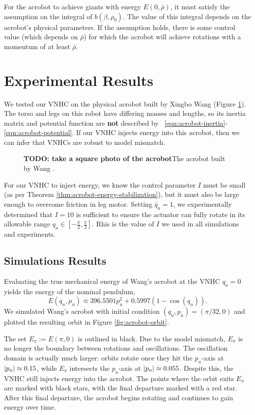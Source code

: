 \documentclass[journal,twoside,web]{ieeecolor}
\DeclarePairedDelimiter{\abs}{\lvert}{\rvert}
\begin{document}
For the acrobot to achieve giants with energy
\(E(0,\bar{\rho})\), it must satisfy the assumption on the integral
of \(b(\beta,\rho_0)\). 
The value of this integral depends on the acrobot's physical parameters.
If the assumption holds, there is some control value
(which depends on \(\bar{\rho}\)) for which the acrobot will 
achieve rotations with a momentum of at least \(\bar{\rho}\).

\section{Experimental Results}\label{sec:experiments}
We tested our VNHC on the physical acrobot built by
Xingbo Wang \cite{xingbo_thesis} (Figure \ref{fig:xingbo-acrobot}).
The torso and legs on this robot have differing masses and lengths, so
its inertia matrix and potential function are \textbf{not} described by 
~\eqref{eqn:acrobot-inertia}-\eqref{eqn:acrobot-potential}.
If our VNHC injects energy into this acrobot, then we can infer that
VNHCs are robust to model mismatch.

\begin{figure}
    \centering
    \caption{\textbf{TODO: take a square photo of the acrobot}The acrobot built by Wang \cite{xingbo_thesis}.}
    \label{fig:xingbo-acrobot}
\end{figure}

For our VNHC to inject energy, we know the control parameter \(I\) must be small
(as per Theorem \ref{thm:acrobot-energy-stabilization}), but it must also be
large enough to overcome friction in leg motor.
Setting \(\bar{q}_a = 1\), we experimentally determined that \(I = 10\) is
sufficient to ensure the actuator can fully rotate in its allowable range \(q_a
\in \left[ -\frac{\pi}{2}, \frac{\pi}{2}\right]\). 
Rhis is the value of \(I\) we used in all simulations and experiments.

\subsection{Simulations Results}
Evaluating the true mechanical energy of Wang's acrobot at the VNHC
\(q_a = 0\) yields the energy of the nominal pendulum,
\[
    E(q_u,p_u) \approx 396.5501 p_u^2 + 0.5997(1 - \cos(q_u))
    .
\]
We simulated Wang's acrobot with initial condition
\((q_u,p_u) = \left(\pi/32,0 \right)\) and plotted the resulting orbit
in Figure \ref{fig:acrobot-orbit}.

The set \(E_\pi := E(\pi,0)\) is outlined in black. 
Due to the model mismatch, \(E_\pi\) is no longer the boundary between
rotations and oscillations.
The oscillation domain is actually much larger: orbits rotate once they hit the
\(p_u\)-axis at \(\abs{p_u} \approx 0.15\), while \(E_\pi\) intersects the
\(p_u\)-axis at \(\abs{p_u} \approx 0.055\).
Despite this, the VNHC still injects energy into the acrobot.
The points where the orbit exits \(E_\pi\) are marked with black stars,
with the final departure marked with a red star.
After this final departure, the acrobot begins rotating and continues to gain
energy over time.
\end{document}
